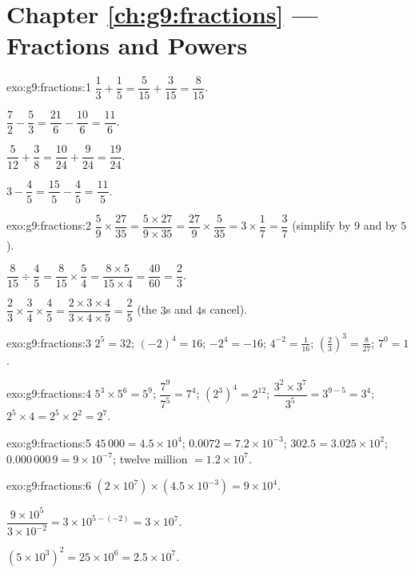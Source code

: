 \section*{Chapter \ref{ch:g9:fractions} --- Fractions and Powers}

\begin{solution}{exo:g9:fractions:1}
$\dfrac13 + \dfrac15 = \dfrac{5}{15} + \dfrac{3}{15} = \dfrac{8}{15}$.

$\dfrac72 - \dfrac53 = \dfrac{21}{6} - \dfrac{10}{6} = \dfrac{11}{6}$.

$\dfrac{5}{12} + \dfrac38 = \dfrac{10}{24} + \dfrac{9}{24} =
\dfrac{19}{24}$.

$3 - \dfrac45 = \dfrac{15}{5} - \dfrac45 = \dfrac{11}{5}$.
\end{solution}

\begin{solution}{exo:g9:fractions:2}
$\dfrac59 \times \dfrac{27}{35} = \dfrac{5 \times 27}{9 \times 35}
= \dfrac{27}{9} \times \dfrac{5}{35} = 3 \times \dfrac17 = \dfrac37$
(simplify by $9$ and by $5$).

$\dfrac{8}{15} \div \dfrac45 = \dfrac{8}{15} \times \dfrac54
= \dfrac{8 \times 5}{15 \times 4} = \dfrac{40}{60} = \dfrac23$.

$\dfrac23 \times \dfrac34 \times \dfrac45 = \dfrac{2 \times 3 \times 4}
{3 \times 4 \times 5} = \dfrac25$ (the $3$s and $4$s cancel).
\end{solution}

\begin{solution}{exo:g9:fractions:3}
$2^5 = 32$; \quad $(-2)^4 = 16$; \quad $-2^4 = -16$; \quad
$4^{-2} = \frac{1}{16}$; \quad
$\left(\frac23\right)^3 = \frac{8}{27}$; \quad $7^0 = 1$.
\end{solution}

\begin{solution}{exo:g9:fractions:4}
$5^3 \times 5^6 = 5^9$; \quad $\dfrac{7^9}{7^5} = 7^4$; \quad
$\left(2^3\right)^4 = 2^{12}$; \quad
$\dfrac{3^2 \times 3^7}{3^5} = 3^{9-5} = 3^4$; \quad
$2^5 \times 4 = 2^5 \times 2^2 = 2^7$.
\end{solution}

\begin{solution}{exo:g9:fractions:5}
$45\,000 = 4.5 \times 10^4$; \quad
$0.0072 = 7.2 \times 10^{-3}$; \quad
$302.5 = 3.025 \times 10^2$; \quad
$0.000\,000\,9 = 9 \times 10^{-7}$; \quad
twelve million $= 1.2 \times 10^7$.
\end{solution}

\begin{solution}{exo:g9:fractions:6}
$(2 \times 10^7) \times (4.5 \times 10^{-3}) = 9 \times 10^{4}$.

$\dfrac{9 \times 10^5}{3 \times 10^{-2}} = 3 \times 10^{5 - (-2)}
= 3 \times 10^7$.

$(5 \times 10^3)^2 = 25 \times 10^6 = 2.5 \times 10^7$.
\end{solution}

